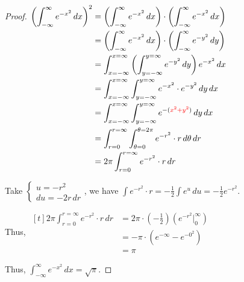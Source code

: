 \begin{proof}
$\begin{aligned}[t]
    \left( \int_{-\infty}^{\infty} e^{-x^2} \,dx \right)^2
     & = \left( \int_{-\infty}^{\infty} e^{-x^2} \,dx \right) \cdot \left( \int_{-\infty}^{\infty} e^{-x^2} \,dx \right) \\
     & = \left( \int_{-\infty}^{\infty} e^{-x^2} \,dx \right) \cdot \left( \int_{-\infty}^{\infty} e^{-y^2} \,dy \right) \\
     & = \int_{x=-\infty}^{x=\infty} \left( \int_{y=-\infty}^{y=\infty} e^{-y^2} \,dy \right) e^{-x^2} \,dx              \\
     & = \int_{x=-\infty}^{x=\infty} \int_{y=-\infty}^{y=\infty} e^{-x^2} \cdot e^{-y^2} \,dy \,dx                       \\
     & = \int_{x=-\infty}^{x=\infty} \int_{y=-\infty}^{y=\infty} e^{{-(\color{red}x^2 + y^2})} \,dy \,dx                 \\
     & = \int_{r=0}^{r=\infty} \int_{\theta=0}^{\theta=2\pi} e^{-r^2} \cdot r \,d\theta \,dr                             \\
     & = 2\pi \int_{r=0}^{r=\infty} e^{-r^2} \cdot r \,dr
\end{aligned}$

Take $\begin{cases} u = -r^2 \\ du = -2r \,dr \end{cases}$, we have $\int e^{-r^2} \cdot r = -\frac{1}{2} \int e^u \,du = -\frac{1}{2} e^{-r^2}$. 

Thus, $\begin{aligned}[t]
    2\pi \int_{r=0}^{r=\infty} e^{-r^2} \cdot r \,dr
     & = 2\pi \cdot \left( -\frac{1}{2} \right) \left( e^{-r^2} \bigg|_{0}^{\infty} \right) \\
     & = -\pi \cdot (e^{-\infty} - e^{-0^2})                                                \\
     & = \pi
\end{aligned}$

Thus, $\int_{-\infty}^\infty e^{-x^2} \,dx = \sqrt{\pi}$. 
\end{proof}